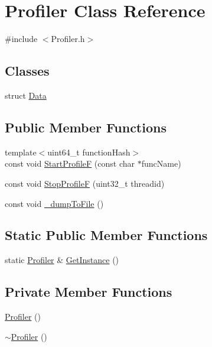 \hypertarget{class_profiler}{}\section{Profiler Class Reference}
\label{class_profiler}


{\ttfamily \#include $<$Profiler.\+h$>$}

\subsection*{Classes}
\begin{DoxyCompactItemize}
\item 
struct \hyperlink{struct_profiler_1_1_data}{Data}
\end{DoxyCompactItemize}
\subsection*{Public Member Functions}
\begin{DoxyCompactItemize}
\item 
{\footnotesize template$<$uint64\+\_\+t function\+Hash$>$ }\\const void \hyperlink{class_profiler_a1d9623c49b247e4b8374dd991d489f45}{Start\+ProfileF} (const char $\ast$func\+Name)
\item 
const void \hyperlink{class_profiler_a6f9e7815c9d08f33ec89f3aedbb85694}{Stop\+ProfileF} (uint32\+\_\+t threadid)
\item 
const void \hyperlink{class_profiler_af6216cfe94749776e49a0886fa91b96c}{\+\_\+dump\+To\+File} ()
\end{DoxyCompactItemize}
\subsection*{Static Public Member Functions}
\begin{DoxyCompactItemize}
\item 
static \hyperlink{class_profiler}{Profiler} \& \hyperlink{class_profiler_af260850db5b9767c969973090c845ab4}{Get\+Instance} ()
\end{DoxyCompactItemize}
\subsection*{Private Member Functions}
\begin{DoxyCompactItemize}
\item 
\hyperlink{class_profiler_a675ebc9207b9aeace1d967c085abeacf}{Profiler} ()
\item 
\hyperlink{class_profiler_a1e6dd8f6cfb15cd5237b971d8f49c749}{$\sim$\+Profiler} ()
\end{DoxyCompactItemize}

